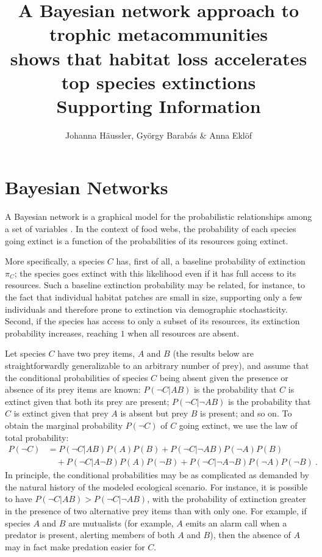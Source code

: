\documentclass[11pt]{article}
\title{A Bayesian network approach to trophic metacommunities\\shows that habitat loss accelerates top species extinctions\\ \medskip Supporting Information}
\author{Johanna H\"aussler, Gy\"orgy Barab\'as \& Anna Ekl\"of}
\date{}
\begin{document}
\maketitle


\section{Bayesian Networks} 
\label{sec:BN}

A Bayesian network is a graphical model for the probabilistic relationships among a set of variables \citep{Jensen1996, Eklofetal2013MEE}. In the context of food webs, the probability of each species going extinct is a function of the probabilities of its resources going extinct.

More specifically, a species $C$ has, first of all, a baseline probability of extinction $\pi_C$; the species goes extinct with this likelihood even if it has full access to its resources. Such a baseline extinction probability may be related, for instance, to the fact that individual habitat patches are small in size, supporting only a few individuals and therefore prone to extinction via demographic stochasticity. Second, if the species has access to only a subset of its resources, its extinction probability increases, reaching $1$ when all resources are absent.

Let species $C$ have two prey items, $A$ and $B$ (the results below are straightforwardly generalizable to an arbitrary number of prey), and assume that the conditional probabilities of species $C$ being absent given the presence or absence of its prey items are known: $P(\neg C|A B)$ is the probability that $C$ is extinct given that both its prey are present; $P(\neg C|\neg A B)$ is the probability that $C$ is extinct given that prey $A$ is absent but prey $B$ is present; and so on. To obtain the marginal probability $P(\neg C)$ of $C$ going extinct, we use the law of total probability:
\begin{equation}
  \label{eq:BN_marginal_example}
  \begin{split}
    P(\neg C) &= P(\neg C|A B)P(A)P(B) + P(\neg C|\neg A B)P(\neg A)P(B)
    \\ &\quad + P(\neg C|A \neg B)P(A)P(\neg B) + P(\neg C|\neg A \neg B)
    P(\neg A)P(\neg B) \ .
  \end{split}
\end{equation}
In principle, the conditional probabilities may be as complicated as demanded by the natural history of the modeled ecological scenario. For instance, it is possible to have $P(\neg C|A B) > P(\neg C| \neg A B)$, with the probability of extinction greater in the presence of two alternative prey items than with only one. For example, if species $A$ and $B$ are mutualists (for example, $A$ emits an alarm call when a predator is present, alerting members of both $A$ and $B$), then the absence of $A$ may in fact make predation easier for $C$.
\end{document}
